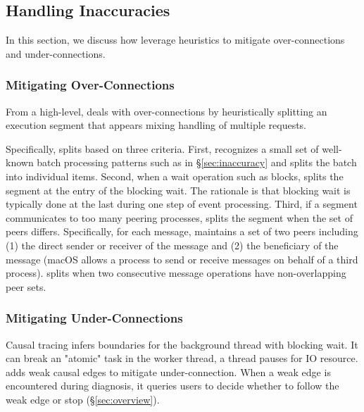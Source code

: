 \subsection{Handling Inaccuracies}

In this section, we discuss how \xxx leverage heuristics to mitigate
over-connections and under-connections.

\subsubsection{Mitigating Over-Connections}\label{subsec:fix-over}

From a high-level, \xxx deals with over-connections by heuristically splitting
an execution segment that appears mixing handling of multiple requests.

Specifically, \xxx splits based on three criteria. First, \xxx recognizes a small
set of well-known batch processing patterns such as 
in \S\ref{sec:inaccuracy} and splits the batch into individual items. Second,
when a wait operation such as  blocks, \xxx splits the segment at the
entry of the blocking wait. The rationale is that blocking wait is typically
done at the last during one step of event processing. Third, if a segment
communicates to too many peering processes, \xxx splits the segment when the
set of peers differs. Specifically, for each message, \xxx maintains a set
of two peers including (1) the direct sender or receiver of the message and
(2) the beneficiary of the message (macOS allows a process to send or receive
messages on behalf of a third process). \xxx splits when two consecutive message
operations have non-overlapping peer sets.

\subsubsection{Mitigating Under-Connections}\label{subsec:fix-under}

Causal tracing infers boundaries for the background thread with blocking wait.
It can break an "atomic" task in the worker thread, \eg a thread pauses for IO
resource. \xxx adds weak causal edges to mitigate under-connection. When a weak
edge is encountered during diagnosis, it queries users to decide whether to
follow the weak edge or stop (\S\ref{sec:overview}).

